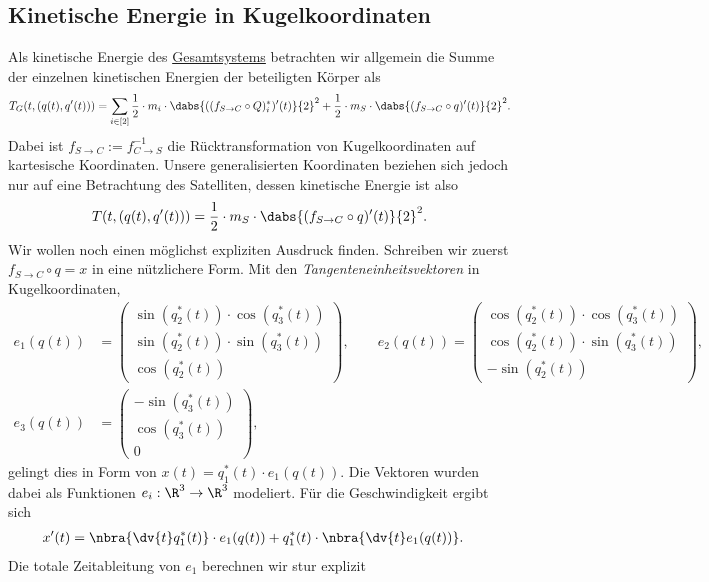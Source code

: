 \documentclass{subfiles}
\begin{document}
    \subsection*{Kinetische Energie in Kugelkoordinaten}
        Als kinetische Energie des \underline{Gesamtsystems} betrachten wir allgemein die Summe der einzelnen kinetischen Energien der beteiligten Körper als
        \[
            T_G(t,(q(t),q'(t))) = \sum_{i\in[2]}\frac12\cdot m_i\cdot\dabs{((f_{S\to C}\circ Q)_i^*)'(t)}{2}^2 + \frac12\cdot m_S\cdot\dabs{(f_{S\to C}\circ q)'(t)}{2}^2.
        \]
        Dabei ist $f_{S\to C}:= f_{C\to S}^{-1}$ die Rücktransformation von Kugelkoordinaten auf kartesische Koordinaten. Unsere generalisierten Koordinaten beziehen sich jedoch nur auf eine Betrachtung des Satelliten, dessen kinetische Energie ist also
        \[
            T(t,(q(t),q'(t))) = \frac12\cdot m_S\cdot\dabs{(f_{S\to C}\circ q)'(t)}{2}^2.
        \] 
        Wir wollen noch einen möglichst expliziten Ausdruck finden. Schreiben wir zuerst $f_{S\to C}\circ q = x$ in eine nützlichere Form. Mit den \textit{Tangenteneinheitsvektoren} in Kugelkoordinaten,
        \begin{align*}
            e_1(q(t)) &= \begin{pmatrix}\sin(q_2^*(t))\cdot\cos(q_3^*(t))\\ \sin(q_2^*(t))\cdot\sin(q_3^*(t))\\ \cos(q_2^*(t))\end{pmatrix},\qquad
            e_2(q(t)) = \begin{pmatrix}\cos(q_2^*(t))\cdot\cos(q_3^*(t))\\ \cos(q_2^*(t))\cdot\sin(q_3^*(t))\\ -\sin(q_2^*(t))\end{pmatrix},\\
            e_3(q(t)) &= \begin{pmatrix}-\sin(q_3^*(t))\\ \cos(q_3^*(t))\\ 0\end{pmatrix},
        \end{align*}
        gelingt dies in Form von $x(t) = q_1^*(t)\cdot e_1(q(t))$. Die Vektoren wurden dabei als Funktionen $e_i: \R^3\to \R^3$ modeliert. Für die Geschwindigkeit ergibt sich 
        \begin{align*}
            x'(t) &= \nbra{\dv{t} q_1^*(t)}\cdot e_1(q(t)) + q_1^*(t)\cdot\nbra{\dv{t} e_1(q(t))}.
        \end{align*}
        Die totale Zeitableitung von $e_1$ berechnen wir stur explizit
\end{document}
